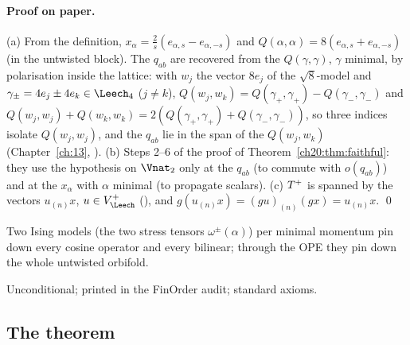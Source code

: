 \paragraph{Proof on paper.}  (a) From the definition,
$x_\alpha=\tfrac2s(e_{\alpha,s}-e_{\alpha,-s})$ and $Q(\alpha,\alpha)=8(e_{\alpha,s}+e_{\alpha,-s})$ (in the untwisted block).  The
$q_{ab}$ are recovered from the $Q(\gamma,\gamma)$, $\gamma$ minimal, by polarisation inside the lattice: with $w_j$ the vector
$8e_j$ of the $\sqrt8$-model and $\gamma_\pm=4e_j\pm4e_k\in\chtwentyLf$ ($j\ne k$), $Q(w_j,w_k)=Q(\gamma_+,\gamma_+)-Q(\gamma_-,\gamma_-)$ and
$Q(w_j,w_j)+Q(w_k,w_k)=2(Q(\gamma_+,\gamma_+)+Q(\gamma_-,\gamma_-))$, so three indices isolate $Q(w_j,w_j)$, and the $q_{ab}$ lie in the
span of the $Q(w_j,w_k)$ (Chapter~\ref{ch:13}, ).  (b) Steps 2--6 of the proof of
Theorem~\ref{ch20:thm:faithful}: they use the hypothesis on $\Vnat_2$ only at the $q_{ab}$ (to commute with $o(q_{ab})$)
and at the $x_\alpha$ with $\alpha$ minimal (to propagate scalars).  (c) $T^{+}$ is spanned by the vectors
$u_{(n)}x$, $u\in\chtwentyVL$ (), and $g(u_{(n)}x)=(gu)_{(n)}(gx)=u_{(n)}x$. \qed
\begin{physics}
Two Ising models (the two stress tensors $\omega^\pm(\alpha)$) per minimal momentum pin down every cosine operator and every
bilinear; through the OPE they pin down the whole untwisted orbifold.
\end{physics}
\begin{status}
Unconditional; printed in the FinOrder audit; standard axioms.
\end{status}

\subsection{The theorem}

